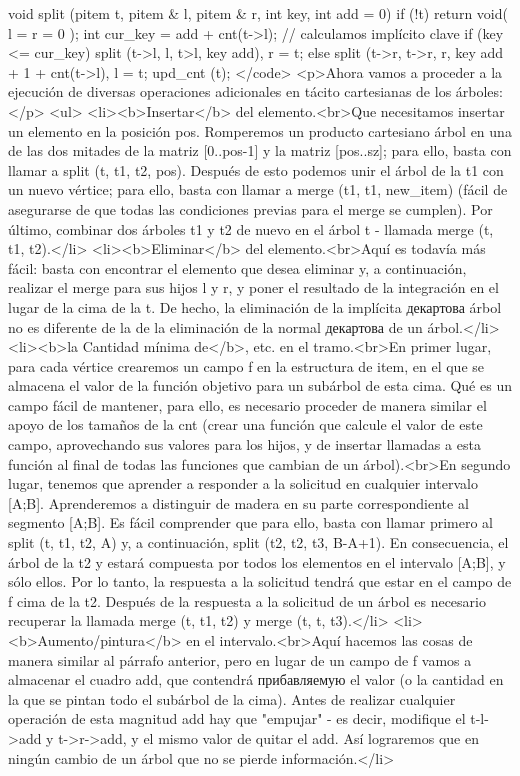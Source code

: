 void split (pitem t, pitem & l, pitem & r, int key, int add = 0) {
if (!t)
return void( l = r = 0 );
int cur_key = add + cnt(t->l); // calculamos implícito clave
if (key <= cur_key)
split (t->l, l, t>l, key add), r = t;
else
split (t->r, t->r, r, key add + 1 + cnt(t->l), l = t;
upd_cnt (t);
}</code>
<p>Ahora vamos a proceder a la ejecución de diversas operaciones adicionales en tácito cartesianas de los árboles:</p>
<ul>
<li><b>Insertar</b> del elemento.<br>Que necesitamos insertar un elemento en la posición pos. Romperemos un producto cartesiano árbol en una de las dos mitades de la matriz [0..pos-1] y la matriz [pos..sz]; para ello, basta con llamar a split (t, t1, t2, pos). Después de esto podemos unir el árbol de la t1 con un nuevo vértice; para ello, basta con llamar a merge (t1, t1, new_item) (fácil de asegurarse de que todas las condiciones previas para el merge se cumplen). Por último, combinar dos árboles t1 y t2 de nuevo en el árbol t - llamada merge (t, t1, t2).</li>
<li><b>Eliminar</b> del elemento.<br>Aquí es todavía más fácil: basta con encontrar el elemento que desea eliminar y, a continuación, realizar el merge para sus hijos l y r, y poner el resultado de la integración en el lugar de la cima de la t. De hecho, la eliminación de la implícita декартова árbol no es diferente de la de la eliminación de la normal декартова de un árbol.</li>
<li><b>la Cantidad mínima de</b>, etc. en el tramo.<br>En primer lugar, para cada vértice crearemos un campo f en la estructura de item, en el que se almacena el valor de la función objetivo para un subárbol de esta cima. Qué es un campo fácil de mantener, para ello, es necesario proceder de manera similar el apoyo de los tamaños de la cnt (crear una función que calcule el valor de este campo, aprovechando sus valores para los hijos, y de insertar llamadas a esta función al final de todas las funciones que cambian de un árbol).<br>En segundo lugar, tenemos que aprender a responder a la solicitud en cualquier intervalo [A;B]. Aprenderemos a distinguir de madera en su parte correspondiente al segmento [A;B]. Es fácil comprender que para ello, basta con llamar primero al split (t, t1, t2, A) y, a continuación, split (t2, t2, t3, B-A+1). En consecuencia, el árbol de la t2 y estará compuesta por todos los elementos en el intervalo [A;B], y sólo ellos. Por lo tanto, la respuesta a la solicitud tendrá que estar en el campo de f cima de la t2. Después de la respuesta a la solicitud de un árbol es necesario recuperar la llamada merge (t, t1, t2) y merge (t, t, t3).</li>
<li><b>Aumento/pintura</b> en el intervalo.<br>Aquí hacemos las cosas de manera similar al párrafo anterior, pero en lugar de un campo de f vamos a almacenar el cuadro add, que contendrá прибавляемую el valor (o la cantidad en la que se pintan todo el subárbol de la cima). Antes de realizar cualquier operación de esta magnitud add hay que "empujar" - es decir, modifique el t-l->add y t->r->add, y el mismo valor de quitar el add. Así lograremos que en ningún cambio de un árbol que no se pierde información.</li>
